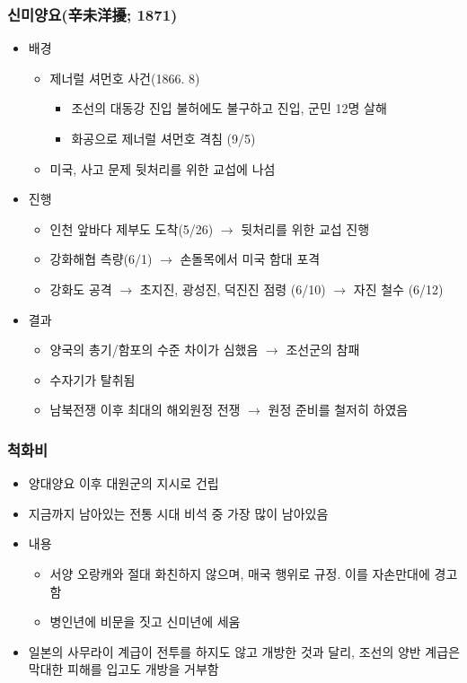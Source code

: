 \subsubsection*{신미양요(辛未洋擾; 1871)}
\begin{itemize}
    \item 배경
    \begin{itemize}
        \item 제너럴 셔먼호 사건(1866. 8)
        \begin{itemize}
            \item 조선의 대동강 진입 불허에도 불구하고 진입, 군민 12명 살해
            \item 화공으로 제너럴 셔먼호 격침 (9/5)
        \end{itemize}
        \item 미국, 사고 문제 뒷처리를 위한 교섭에 나섬
    \end{itemize}
    \item 진행
    \begin{itemize}
        \item 인천 앞바다 제부도 도착(5/26) $\rightarrow$ 뒷처리를 위한 교섭 진행
        \item 강화해협 측량(6/1) $\rightarrow$ 손돌목에서 미국 함대 포격
        \item 강화도 공격 $\rightarrow$ 초지진, 광성진, 덕진진 점령 (6/10) $\rightarrow$ 자진 철수 (6/12)
    \end{itemize}
    \item 결과
    \begin{itemize}
        \item 양국의 총기/함포의 수준 차이가 심했음 $\rightarrow$ 조선군의 참패
        \item 수자기가 탈취됨
        \item 남북전쟁 이후 최대의 해외원정 전쟁 $\rightarrow$ 원정 준비를 철저히 하였음
    \end{itemize}
\end{itemize}

\subsubsection*{척화비}

\begin{itemize}
    \item 양대양요 이후 대원군의 지시로 건립
    \item 지금까지 남아있는 전통 시대 비석 중 가장 많이 남아있음
    \item 내용
    \begin{itemize}
        \item 서양 오랑캐와 절대 화친하지 않으며, 매국 행위로 규정. 이를 자손만대에 경고함
        \item 병인년에 비문을 짓고 신미년에 세움
    \end{itemize}
    \item 일본의 사무라이 계급이 전투를 하지도 않고 개방한 것과 달리, 조선의 양반 계급은 막대한 피해를 입고도 개방을 거부함
\end{itemize}
